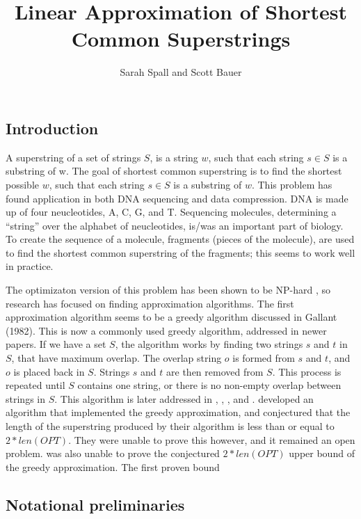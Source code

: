 \documentclass[letterpaper,11pt,titlepage]{article}
\title{Linear Approximation of Shortest Common Superstrings}
\author[1]{Sarah Spall and Scott Bauer}
\begin{document}
\maketitle
\newpage

\subsection*{Introduction}
A superstring of a set of strings $S$, is a string $w$, such that each string $s \in S$ is a substring
of w.  The goal of shortest common superstring is to find the shortest possible $w$, such that each 
string $s \in S$ is a substring of $w$. This problem has found application in both DNA sequencing 
and data compression.  DNA is made up of four neucleotides, A, C, G, and T.  Sequencing molecules,
determining a ``string'' over the alphabet of neucleotides, is/was an important part of biology.  To 
create the sequence of a molecule, fragments (pieces of the molecule), are used to find the shortest
common superstring of the fragments; this seems to work well in practice.  \cite{li1990towards}

 
The optimizaton version of this problem has been shown to be NP-hard \cite{blum1991linear} \cite{johngallant1980}, 
so research has focused on finding approximation algorithms.  The first approximation 
algorithm seems to be a greedy algorithm discussed in Gallant (1982). This is now a commonly used greedy 
algorithm, addressed in newer papers.  If we have a set $S$, the algorithm works by finding two strings $s$
and $t$ in $S$, that have maximum overlap.  The overlap string $o$ is formed from $s$ and $t$, and $o$ is
placed back in $S$.  Strings $s$ and $t$ are then removed from $S$.  This process is repeated until
$S$ contains one string, or there is no non-empty overlap between strings in $S$.  This algorithm is later
addressed in \cite{turner1989approximation}, \cite{tarhio1988greedy}, \cite{li1990towards}, and \cite{blum1991linear}.
\cite{tarhio1988greedy} developed an algorithm that implemented the greedy approximation, and conjectured that 
the length of the superstring produced by their algorithm is less than or equal to $2*len(OPT)$.  They were unable
to prove this however, and it remained an open problem.  \cite{turner1989approximation} was also unable to prove
the conjectured $2*len(OPT)$ upper bound of the greedy approximation.  The first proven bound 

\subsection*{Notational preliminaries}\\
\end{document}
